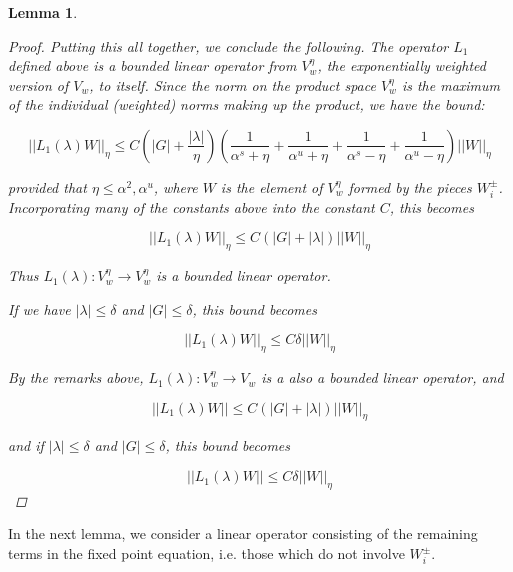 \documentclass[12pt]{article}
\newtheorem{lemma}{Lemma}
\begin{document}
\begin{lemma}
\begin{proof}
Putting this all together, we conclude the following. The operator $L_1$ defined above is a bounded linear operator from $V_w^\eta$, the exponentially weighted version of $V_w$, to itself. Since the norm on the product space $V_w^\eta$ is the maximum of the individual (weighted) norms making up the product, we have the bound:

\begin{equation}
	||L_1(\lambda)W||_\eta \leq C\left(|G| + \frac{|\lambda|}{\eta}\right)\left(\frac{1}{\alpha^s + \eta} + \frac{1}{\alpha^u + \eta} + \frac{1}{\alpha^s - \eta} + \frac{1}{\alpha^u - \eta}\right)||W||_\eta
\end{equation}

provided that $\eta \leq \alpha^2, \alpha^u$, where $W$ is the element of $V_w^\eta$ formed by the pieces $W_i^\pm$. Incorporating many of the constants above into the constant $C$, this becomes

\begin{equation}
||L_1(\lambda)W||_\eta \leq C\left(|G| +|\lambda|\right)||W||_\eta
\end{equation}

Thus $L_1(\lambda): V_w^\eta \rightarrow V_w^\eta$ is a bounded linear operator. 

If we have $|\lambda| \leq \delta$ and $|G| \leq \delta$, this bound becomes

\begin{equation}
||L_1(\lambda)W||_\eta \leq C \delta ||W||_\eta
\end{equation}

By the remarks above, $L_1(\lambda): V_w^\eta \rightarrow V_w$ is a also a bounded linear operator, and

\begin{equation}
||L_1(\lambda)W|| \leq C\left(|G| +|\lambda|\right)||W||_\eta
\end{equation}

and if $|\lambda| \leq \delta$ and $|G| \leq \delta$, this bound becomes

\begin{equation}
||L_1(\lambda)W|| \leq C \delta ||W||_\eta
\end{equation}

\end{proof}
\end{lemma}

In the next lemma, we consider a linear operator consisting of the remaining terms in the fixed point equation, i.e. those which do not involve $W_i^\pm$.
\end{document}
